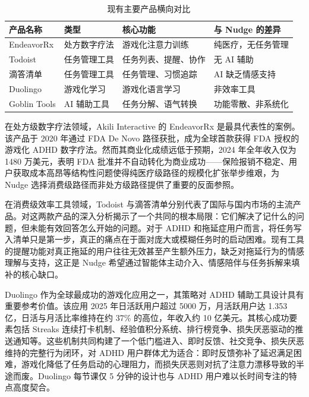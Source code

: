 \begin{table}[htbp]
  \centering
  \caption{现有主要产品横向对比}
  \label{tab:competitor-comparison}
  \begin{tabular}{p{2.5cm}p{2.75cm}p{4cm}p{3.75cm}}
    \hline
    产品名称 & 类型 & 核心功能 & 与 Nudge 的差异 \\
    \hline
    EndeavorRx & 处方数字疗法 & 游戏化注意力训练 & 纯医疗，无任务管理 \\
    Todoist & 任务管理工具 & 任务列表、提醒、协作 & 无 AI 辅助 \\
    滴答清单 & 任务管理工具 & 任务管理、习惯追踪 & AI 缺乏情感支持 \\
    Duolingo & 游戏化学习 & 游戏化语言学习 & 非效率工具 \\
    Goblin Tools & AI 辅助工具 & 任务分解、语气转换 & 功能零散、非系统化 \\
    \hline
  \end{tabular}
\end{table}

\par 在处方级数字疗法领域，Akili Interactive 的 EndeavorRx 是最具代表性的案例。该产品于 2020 年通过 FDA De Novo 路径获批，成为全球首款获得 FDA 授权的游戏化 ADHD 数字疗法\cite{akili2025endeavorrx}。然而其商业化成绩远低于预期，2024 年全年收入仅为 1480 万美元，表明 FDA 批准并不自动转化为商业成功——保险报销不稳定、用户获取成本高昂等结构性问题使得纯医疗级路径的规模化扩张举步维艰，为 Nudge 选择消费级路径而非处方级路径提供了重要的反面参照。

\par 在消费级效率工具领域，Todoist 与滴答清单分别代表了国际与国内市场的主流产品\cite{todoist,dida365}。对这两款产品的深入分析揭示了一个共同的根本局限：它们解决了记什么的问题，但未能有效回答怎么开始的问题\cite{todoistdida3652025}。对于 ADHD 和拖延症用户而言，将任务写入清单只是第一步，真正的痛点在于面对庞大或模糊任务时的启动困难。现有工具的提醒功能对真正拖延的用户往往无效甚至产生额外压力，缺乏对拖延行为的情感理解与支持，这正是 Nudge 希望通过智能体主动介入、情感陪伴与任务拆解来填补的核心缺口。

\par Duolingo 作为全球最成功的游戏化应用之一，其策略对 ADHD 辅助工具设计具有重要参考价值。该应用 2025 年日活跃用户超过 5000 万，月活跃用户达 1.353 亿，日活与月活比率维持在约 37\% 的高位，年收入约 10 亿美元\cite{duolingo2025}。其核心成功要素包括 Streaks 连续打卡机制、经验值积分系统、排行榜竞争、损失厌恶驱动的推送通知等。这些机制共同构建了一个低门槛进入、即时反馈、社交竞争、损失厌恶维持的完整行为闭环，对 ADHD 用户群体尤为适合：即时反馈弥补了延迟满足困难，游戏化降低了任务启动的心理阻力，而损失厌恶则对抗了注意力漂移导致的半途而废。Duolingo 每节课仅 5 分钟的设计也与 ADHD 用户难以长时间专注的特点高度契合。

